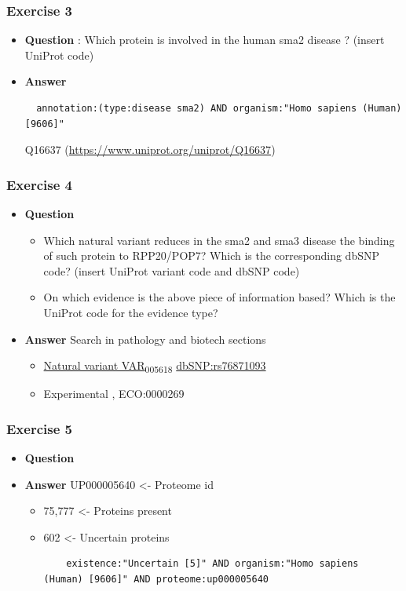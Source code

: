 \documentclass[11pt]{article}
\begin{document}
\subsubsection{Exercise 3}
\label{sec:org195ce25}
\begin{itemize}
\item \textbf{Question} :
Which protein is involved in the human sma2 disease ? (insert UniProt code)

\item \textbf{Answer}
\begin{verbatim}
  annotation:(type:disease sma2) AND organism:"Homo sapiens (Human) [9606]"
\end{verbatim}

Q16637 (\url{https://www.uniprot.org/uniprot/Q16637})
\end{itemize}

\subsubsection{Exercise 4}
\label{sec:orgc116e85}
\begin{itemize}
\item \textbf{Question}
\begin{itemize}
\item Which natural variant reduces in the sma2 and sma3 disease the binding of such protein to RPP20/POP7?  Which is the corresponding dbSNP code? (insert UniProt variant code and dbSNP code)
\item On which evidence is the above piece of information based? Which is the
UniProt code for the evidence type?
\end{itemize}
\item \textbf{Answer}
Search in pathology and biotech sections
\begin{itemize}
\item \uline{Natural variant VAR\textsubscript{005618}}   \uline{dbSNP:rs76871093}
\item Experimental ,  ECO:0000269
\end{itemize}
\end{itemize}

\subsubsection{Exercise 5}
\label{sec:org1c9f9f0}
\begin{itemize}
\item \textbf{Question}

\item \textbf{Answer}
UP000005640 <- Proteome id
\begin{itemize}
\item 75,777 <- Proteins present
\item 602 <- Uncertain proteins
\begin{verbatim}
    existence:"Uncertain [5]" AND organism:"Homo sapiens (Human) [9606]" AND proteome:up000005640
\end{verbatim}
\end{itemize}
\end{itemize}
\end{document}
